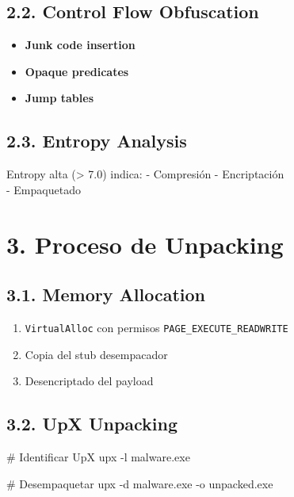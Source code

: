 \documentclass[
  letterpaper,
]{report}
\newenvironment{Shaded}{\begin{snugshade}}{\end{snugshade}}
\newcommand{\AttributeTok}[1]{\textcolor[rgb]{0.40,0.45,0.13}{#1}}
\newcommand{\CommentTok}[1]{\textcolor[rgb]{0.37,0.37,0.37}{#1}}
\newcommand{\ExtensionTok}[1]{\textcolor[rgb]{0.00,0.23,0.31}{#1}}
\newcommand{\NormalTok}[1]{\textcolor[rgb]{0.00,0.23,0.31}{#1}}
\providecommand{\tightlist}{%
  \setlength{\itemsep}{0pt}\setlength{\parskip}{0pt}}
\begin{document}
\subsection{2.2. Control Flow
Obfuscation}\label{control-flow-obfuscation}

\begin{itemize}
\tightlist
\item
  \textbf{Junk code insertion}
\item
  \textbf{Opaque predicates}
\item
  \textbf{Jump tables}
\end{itemize}

\subsection{2.3. Entropy Analysis}\label{entropy-analysis}

Entropy alta (\textgreater{} 7.0) indica: - Compresión - Encriptación\\
- Empaquetado

\section{3. Proceso de Unpacking}\label{proceso-de-unpacking}

\subsection{3.1. Memory Allocation}\label{memory-allocation}

\begin{enumerate}
\def\labelenumi{\arabic{enumi}.}
\tightlist
\item
  \texttt{VirtualAlloc} con permisos \texttt{PAGE\_EXECUTE\_READWRITE}
\item
  Copia del stub desempacador
\item
  Desencriptado del payload
\end{enumerate}

\subsection{3.2. UpX Unpacking}\label{upx-unpacking}

\begin{Shaded}
\begin{Highlighting}[]
\CommentTok{\# Identificar UpX}
\ExtensionTok{upx} \AttributeTok{{-}l}\NormalTok{ malware.exe}

\CommentTok{\# Desempaquetar}
\ExtensionTok{upx} \AttributeTok{{-}d}\NormalTok{ malware.exe }\AttributeTok{{-}o}\NormalTok{ unpacked.exe}
\end{Highlighting}
\end{Shaded}
\end{document}
